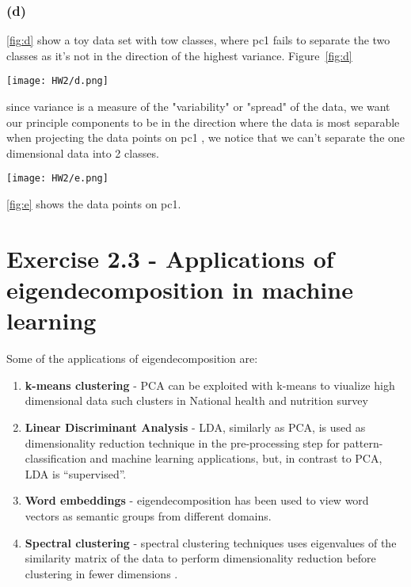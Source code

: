\documentclass{article}[a4paper]
\begin{document}
\subsubsection*{(d)}
\ref{fig:d} show a toy data set with tow classes, where pc1 fails to separate the two classes as it's not in the direction of the highest variance.
Figure~\ref{fig:d}
\begin{figure*}[ht]
  \centering
  \texttt{[image: HW2/d.png]}
  \caption{\textit{Date set in 2-dimensional space}}
  \label{fig:d}
\end{figure*}
\clearpage
since variance is a measure of the "variability" or "spread" of the data, we want our principle components to be in the direction where the data is most separable 
\\
when projecting the data points on pc1 , we notice that we can't separate the one dimensional data into 2 classes.

\begin{figure*}[ht]
  \centering
  \texttt{[image: HW2/e.png]}
  \caption{\textit{Data projected to pc1}}
  \label{fig:e}
\end{figure*}
\ref{fig:e} shows the data points on pc1. 

\section*{Exercise 2.3 - Applications of eigendecomposition in machine learning}
Some of the applications of eigendecomposition are:
\begin{enumerate}
    \item  \textbf{k-means clustering} \cite{Dmitriy:2019} - PCA can be exploited with k-means to viualize high dimensional data such clusters in National health and nutrition survey
    \item \textbf{Linear Discriminant Analysis} \cite{LDA} - LDA, similarly as PCA, is used as dimensionality reduction technique in the pre-processing step for pattern-classification and machine learning applications, but, in contrast to PCA, LDA is “supervised”.
    \item \textbf{Word embeddings} \cite{shin2018interpreting}- eigendecomposition has been used to view word vectors as semantic groups from different domains. 
    \item \textbf{Spectral clustering} \cite{spectral_clustering}- spectral clustering techniques uses eigenvalues of the similarity matrix of the data to perform dimensionality reduction before clustering in fewer dimensions
. 
\end{enumerate}




\end{document}

